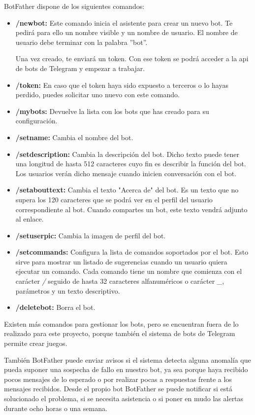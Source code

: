 \documentclass[spanish,12pt, a4paper, twoside]{paper}
\begin{document}
BotFather dispone de los siguientes comandos:
\begin{itemize}
\item\textbf{/newbot:} Este comando inicia el asistente para crear un nuevo bot. Te pedirá para ello un nombre visible y un nombre de usuario. El nombre de usuario debe terminar con la palabra ''bot''.

Una vez creado, te enviará un token. Con ese token se podrá acceder a la api de bots de Telegram y empezar a trabajar.

\item\textbf{/token:} En caso que el token haya sido expuesto a terceros o lo hayas perdido, puedes solicitar uno nuevo con este comando.
\item\textbf{/mybots:} Devuelve la lista con los bots que has creado para su configuración.
\item\textbf{/setname:} Cambia el nombre del bot.
\item\textbf{/setdescription:} Cambia la descripción del bot. Dicho texto puede tener una longitud de hasta 512 caracteres cuyo fin es describir la función del bot. Los usuarios verán dicho mensaje cuando inicien conversación con el bot.
\item\textbf{/setabouttext:} Cambia el texto "Acerca de" del bot. Es un texto que no supera los 120 caracteres que se podrá ver en el perfil del usuario correspondiente al bot. Cuando compartes un bot, este texto vendrá adjunto al enlace.
\item\textbf{/setuserpic:} Cambia la imagen de perfil del bot.
\item\textbf{/setcommands:} Configura la lista de comandos soportados por el bot. Esto sirve para mostrar un listado de sugerencias cuando un usuario quiera ejecutar un comando. Cada comando tiene un nombre que comienza con el carácter \emph{/} seguido de hasta 32 caracteres alfanuméricos o carácter \emph{\_}, parámetros y un texto descriptivo.
\item\textbf{/deletebot:} Borra el bot.
\end{itemize}

Existen más comandos para gestionar los bots, pero se encuentran fuera de lo realizado para este proyecto, porque también el sistema de bots de Telegram permite crear juegos.
\newline

También BotFather puede enviar avisos si el sistema detecta alguna anomalía que pueda suponer una sospecha de fallo en nuestro bot, ya sea porque haya recibido pocos mensajes de lo esperado o por realizar pocas a respuestas frente a los mensajes recibidos. Desde el propio bot BotFather se puede notificar si está solucionado el problema, si se necesita asistencia o si poner en mudo las alertas durante ocho horas o una semana.
\newline
\end{document}

